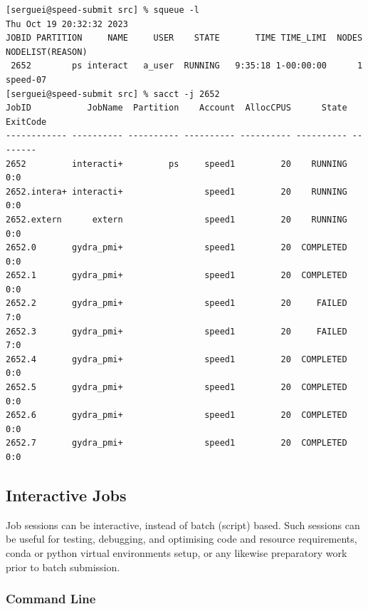 \small
\begin{verbatim}
[serguei@speed-submit src] % squeue -l
Thu Oct 19 20:32:32 2023
JOBID PARTITION     NAME     USER    STATE       TIME TIME_LIMI  NODES NODELIST(REASON)
 2652        ps interact   a_user  RUNNING   9:35:18 1-00:00:00      1 speed-07
[serguei@speed-submit src] % sacct -j 2652
JobID           JobName  Partition    Account  AllocCPUS      State ExitCode
------------ ---------- ---------- ---------- ---------- ---------- --------
2652         interacti+         ps     speed1         20    RUNNING      0:0
2652.intera+ interacti+                speed1         20    RUNNING      0:0
2652.extern      extern                speed1         20    RUNNING      0:0
2652.0       gydra_pmi+                speed1         20  COMPLETED      0:0
2652.1       gydra_pmi+                speed1         20  COMPLETED      0:0
2652.2       gydra_pmi+                speed1         20     FAILED      7:0
2652.3       gydra_pmi+                speed1         20     FAILED      7:0
2652.4       gydra_pmi+                speed1         20  COMPLETED      0:0
2652.5       gydra_pmi+                speed1         20  COMPLETED      0:0
2652.6       gydra_pmi+                speed1         20  COMPLETED      0:0
2652.7       gydra_pmi+                speed1         20  COMPLETED      0:0
\end{verbatim}
\normalsize

\subsection{Interactive Jobs}
\label{sect:interactive-jobs}

Job sessions can be interactive, instead of batch (script) based. Such 
sessions can be useful for testing, debugging, and optimising code and resource 
requirements, conda or python virtual environments setup, or any likewise
preparatory work prior to batch submission.

\subsubsection{Command Line}

